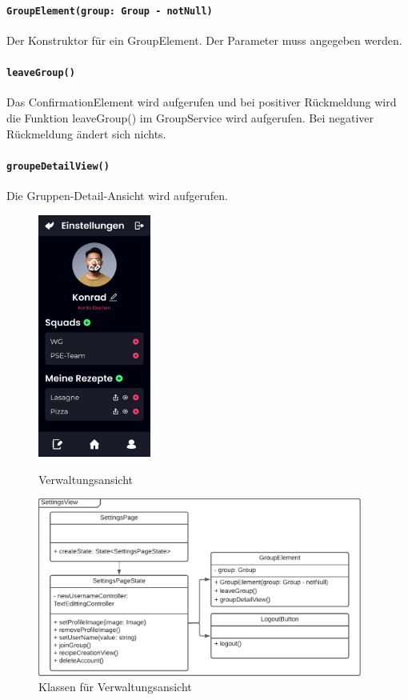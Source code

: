 \documentclass[parskip=full]{scrartcl}
\begin{document}
            \paragraph*{\texttt{GroupElement(group: Group - notNull)}} Der Konstruktor für ein GroupElement. Der Parameter muss angegeben werden.
            \paragraph*{\texttt{leaveGroup()}} Das ConfirmationElement wird aufgerufen und bei positiver Rückmeldung wird die Funktion leaveGroup() im GroupService wird aufgerufen. Bei negativer Rückmeldung ändert sich nichts.
            \paragraph*{\texttt{groupeDetailView()}} Die Gruppen-Detail-Ansicht wird aufgerufen.
            
    \begin{figure}[htp]
        \begin{minipage}
            [t]{0.49\textwidth}
            \centering
            \includegraphics[height=80mm]{images/Presentation-layer/SettingsView.jpg}
            \caption{Verwaltungsansicht}
        \end{minipage}
        \begin{minipage}
            [t]{0.49\textwidth}
            \centering
            \includegraphics[width=0.95\textwidth]{images/Presentation-layer/SettingsViewClass.pdf}
            \caption{Klassen für Verwaltungsansicht}
        \end{minipage}
    \end{figure}    
        
\end{document}
